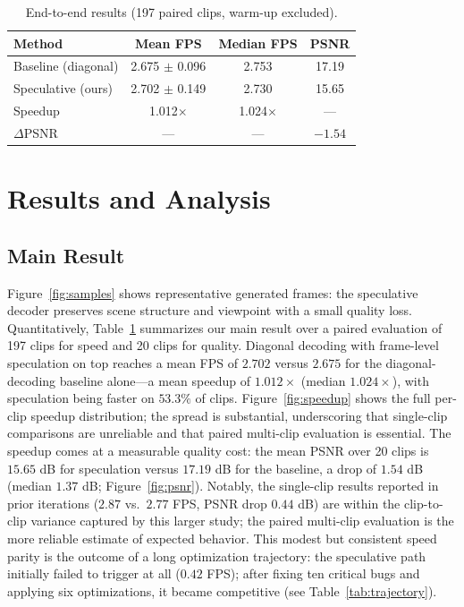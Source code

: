 \documentclass[10pt, twocolumn]{article}
\begin{document}
\begin{table}[!ht]
  \centering
  \small
  \caption{End-to-end results (197 paired clips, warm-up excluded).}
  \label{tab:main}
  \setlength{\tabcolsep}{4pt}
  \begin{tabular}{lccc}
    \toprule
    Method & Mean FPS & Median FPS & PSNR \\
    \midrule
    Baseline (diagonal) & 2.675 $\pm$ 0.096 & 2.753 & 17.19 \\
    Speculative (ours) & 2.702 $\pm$ 0.149 & 2.730 & 15.65 \\
    \midrule
    Speedup & 1.012$\times$ & 1.024$\times$ & --- \\
    $\Delta$PSNR & --- & --- & $-1.54$ \\
    \bottomrule
  \end{tabular}
\end{table}

\section{Results and Analysis}
\label{sec:results}

\subsection{Main Result}
Figure~\ref{fig:samples} shows representative generated frames: the speculative decoder preserves scene structure and viewpoint with a small quality loss. Quantitatively, Table~\ref{tab:main} summarizes our main result over a paired evaluation of 197 clips for speed and 20 clips for quality. Diagonal decoding with frame-level speculation on top reaches a mean FPS of $2.702$ versus $2.675$ for the diagonal-decoding baseline alone---a mean speedup of $1.012\times$ (median $1.024\times$), with speculation being faster on $53.3\%$ of clips. Figure~\ref{fig:speedup} shows the full per-clip speedup distribution; the spread is substantial, underscoring that single-clip comparisons are unreliable and that paired multi-clip evaluation is essential. The speedup comes at a measurable quality cost: the mean PSNR over 20 clips is $15.65$ dB for speculation versus $17.19$ dB for the baseline, a drop of $1.54$ dB (median $1.37$ dB; Figure~\ref{fig:psnr}). Notably, the single-clip results reported in prior iterations ($2.87$ vs.\ $2.77$ FPS, PSNR drop $0.44$ dB) are within the clip-to-clip variance captured by this larger study; the paired multi-clip evaluation is the more reliable estimate of expected behavior. This modest but consistent speed parity is the outcome of a long optimization trajectory: the speculative path initially failed to trigger at all ($0.42$ FPS); after fixing ten critical bugs and applying six optimizations, it became competitive (see Table~\ref{tab:trajectory}).
\end{document}
